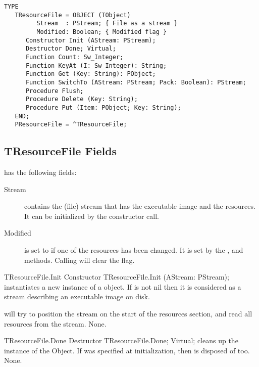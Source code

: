 \begin{verbatim}
TYPE
   TResourceFile = OBJECT (TObject)
         Stream  : PStream; { File as a stream }
         Modified: Boolean; { Modified flag }
      Constructor Init (AStream: PStream);
      Destructor Done; Virtual;
      Function Count: Sw_Integer;
      Function KeyAt (I: Sw_Integer): String;
      Function Get (Key: String): PObject;
      Function SwitchTo (AStream: PStream; Pack: Boolean): PStream;
      Procedure Flush;
      Procedure Delete (Key: String);
      Procedure Put (Item: PObject; Key: String);
   END;
   PResourceFile = ^TResourceFile;
\end{verbatim}

\subsection{TResourceFile Fields}

 has the following fields:
\begin{description}
\item[Stream] contains the (file) stream that has the executable image and
the resources. It can be initialized by the 
constructor call.
\item[Modified] is set to  if one of the resources has been changed.
It is set by the ,
 and 
methods. Calling  will clear the
 flag.
\end{description}

\begin{procedure}{TResourceFile.Init}
\Declaration
Constructor TResourceFile.Init (AStream: PStream);
\Description
{} instantiates a new instance of a  object.
If  is not nil then it is considered as a stream describing an
executable image on disk. 

 will try to position the stream on the start of the resources section,
and read all resources from the stream.
\Errors
None.
\SeeAlso
{}
\end{procedure}

\begin{procedure}{TResourceFile.Done}
\Declaration
Destructor TResourceFile.Done; Virtual;
\Description
{} cleans up the instance of the  Object. 
If  was specified at initialization, then  is 
disposed of too.
\Errors
None.
\SeeAlso
{}
\end{procedure}

